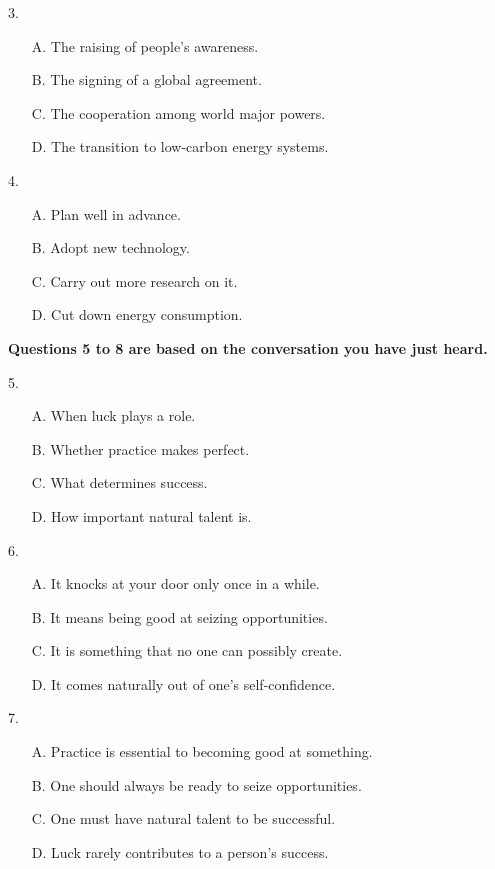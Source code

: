 \documentclass[UTF8,11pt]{ctexart}
\begin{document}
3.


\begin{itemize}[leftmargin=2em,itemsep=.2em,topsep=.4em]\item[A.] The raising of people’s awareness.
\item[B.] The signing of a global agreement.
\item[C.] The cooperation among world major powers.
\item[D.] The transition to low-carbon energy systems.
\end{itemize}

4.


\begin{itemize}[leftmargin=2em,itemsep=.2em,topsep=.4em]\item[A.] Plan well in advance.
\item[B.] Adopt new technology.
\item[C.] Carry out more research on it.
\item[D.] Cut down energy consumption.
\end{itemize}

\textbf{Questions 5 to 8 are based on the conversation you have just heard.}


5.


\begin{itemize}[leftmargin=2em,itemsep=.2em,topsep=.4em]\item[A.] When luck plays a role.
\item[B.] Whether practice makes perfect.
\item[C.] What determines success.
\item[D.] How important natural talent is.
\end{itemize}

6.


\begin{itemize}[leftmargin=2em,itemsep=.2em,topsep=.4em]\item[A.] It knocks at your door only once in a while.
\item[B.] It means being good at seizing opportunities.
\item[C.] It is something that no one can possibly create.
\item[D.] It comes naturally out of one’s self-confidence.
\end{itemize}

7.


\begin{itemize}[leftmargin=2em,itemsep=.2em,topsep=.4em]\item[A.] Practice is essential to becoming good at something.
\item[B.] One should always be ready to seize opportunities.
\item[C.] One must have natural talent to be successful.
\item[D.] Luck rarely contributes to a person’s success.
\end{itemize}
\end{document}
